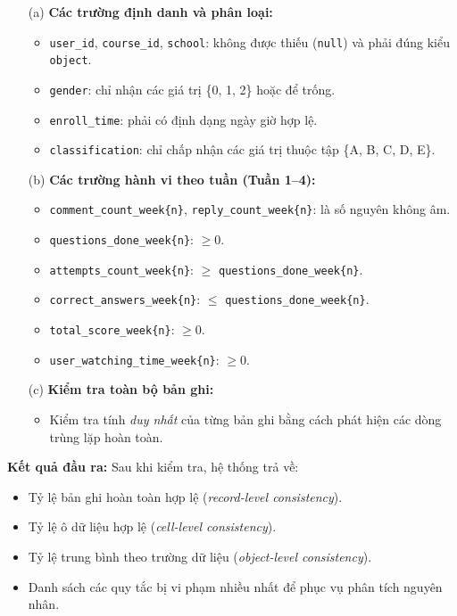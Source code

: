 \begin{itemize}
    \item[(a)] \textbf{Các trường định danh và phân loại:}
    \begin{itemize}
        \item \texttt{user\_id}, \texttt{course\_id}, \texttt{school}: không được thiếu (\texttt{null}) và phải đúng kiểu \texttt{object}.
        \item \texttt{gender}: chỉ nhận các giá trị \{0, 1, 2\} hoặc để trống.
        \item \texttt{enroll\_time}: phải có định dạng ngày giờ hợp lệ.
        \item \texttt{classification}: chỉ chấp nhận các giá trị thuộc tập \{A, B, C, D, E\}.
    \end{itemize}

    \item[(b)] \textbf{Các trường hành vi theo tuần (Tuần 1–4):}
    \begin{itemize}
        \item \texttt{comment\_count\_week\{n\}}, \texttt{reply\_count\_week\{n\}}: là số nguyên không âm.
        \item \texttt{questions\_done\_week\{n\}}: $\geq 0$.
        \item \texttt{attempts\_count\_week\{n\}}: $\geq$ \texttt{questions\_done\_week\{n\}}.
        \item \texttt{correct\_answers\_week\{n\}}: $\leq$ \texttt{questions\_done\_week\{n\}}.
        \item \texttt{total\_score\_week\{n\}}: $\geq 0$.
        \item \texttt{user\_watching\_time\_week\{n\}}: $\geq 0$.
    \end{itemize}

    \item[(c)] \textbf{Kiểm tra toàn bộ bản ghi:}
    \begin{itemize}
        \item Kiểm tra tính \textit{duy nhất} của từng bản ghi bằng cách phát hiện các dòng trùng lặp hoàn toàn.
    \end{itemize}
\end{itemize}

\textbf{Kết quả đầu ra:} Sau khi kiểm tra, hệ thống trả về:
\begin{itemize}
    \item Tỷ lệ bản ghi hoàn toàn hợp lệ (\textit{record-level consistency}).
    \item Tỷ lệ ô dữ liệu hợp lệ (\textit{cell-level consistency}).
    \item Tỷ lệ trung bình theo trường dữ liệu (\textit{object-level consistency}).
    \item Danh sách các quy tắc bị vi phạm nhiều nhất để phục vụ phân tích nguyên nhân.
\end{itemize}

